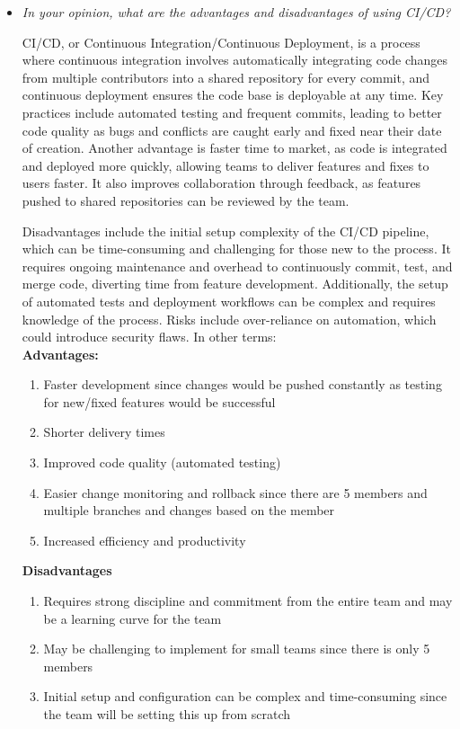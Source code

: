\documentclass{article}
\begin{document}
\begin{itemize}
    \item \textit{In your opinion, what are the advantages and disadvantages of using CI/CD?}

    CI/CD, or Continuous Integration/Continuous Deployment, is a process where continuous integration involves automatically integrating code changes from multiple contributors into a shared repository for every commit, and continuous deployment ensures the code base is deployable at any time. Key practices include automated testing and frequent commits, leading to better code quality as bugs and conflicts are caught early and fixed near their date of creation. Another advantage is faster time to market, as code is integrated and deployed more quickly, allowing teams to deliver features and fixes to users faster. It also improves collaboration through feedback, as features pushed to shared repositories can be reviewed by the team.

    Disadvantages include the initial setup complexity of the CI/CD pipeline, which can be time-consuming and challenging for those new to the process. It requires ongoing maintenance and overhead to continuously commit, test, and merge code, diverting time from feature development. Additionally, the setup of automated tests and deployment workflows can be complex and requires knowledge of the process. Risks include over-reliance on automation, which could introduce security flaws.
    In other terms:\\
    \textbf{Advantages:}
    \begin{enumerate}
      \item Faster development since changes would be pushed constantly as testing for new/fixed features would be successful
      \item Shorter delivery times
      \item Improved code quality (automated testing)
      \item Easier change monitoring and rollback since there are 5 members and multiple branches and changes based on the member
      \item Increased efficiency and productivity
    \end{enumerate}
    \textbf{Disadvantages}
    \begin{enumerate}
      \item Requires strong discipline and commitment from the entire team and may be a learning curve for the team
      \item May be challenging to implement for small teams since there is only 5 members
      \item Initial setup and configuration can be complex and time-consuming since the team will be setting this up from scratch
    \end{enumerate}

\end{itemize}
\end{document}
